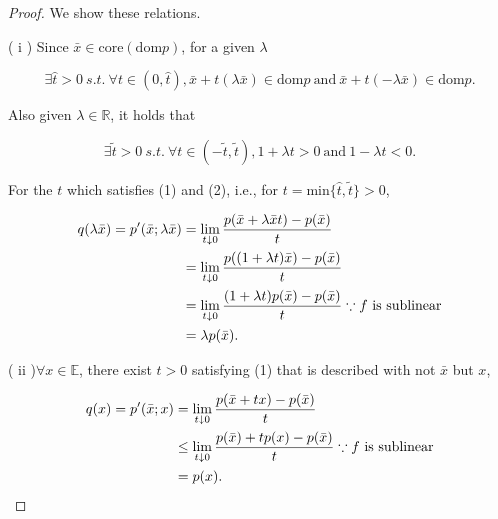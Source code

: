 \documentclass[a4paper,11pt]{jsarticle}
\begin{document}
\begin{proof} We show these relations.

  ( $\mathrm{i}$ ) Since $\bar{x} \in \text{core}(\text{dom}p)$, for a given $\lambda$

  \begin{equation}
    \exists\hat{t}>0 \:s.t.\: \forall t \in (0,\hat{t}), \bar{x}+t(\lambda \bar{x}) \in \text{dom}p \:\text{and}\: \bar{x}+t(-\lambda \bar{x}) \in \text{dom}p. \tag*{(1)}
  \end{equation}

  Also given $\lambda \in \mathbb{R}$, it holds that

  \begin{equation}
    \exists\widetilde{t}>0 \:s.t.\: \forall t \in (-\widetilde{t},\widetilde{t}), 1+\lambda t>0 \:\text{and}\: 1-\lambda t<0. \tag*{(2)}
  \end{equation}


  For the $t$ which satisfies (1) and (2), i.e., for $t = \text{min}\{\hat{t},\widetilde{t}\} >0$,

  \begin{equation}
    \begin{split}
      q(\lambda \bar{x}) = p'(\bar{x};\lambda \bar{x}) &= \lim_{t \downarrow 0} \frac{p(\bar{x}+\lambda \bar{x}t)-p(\bar{x})}{t} \\
      &= \lim_{t \downarrow 0} \frac{p((1 + \lambda t)\bar{x}) - p(\bar{x})}{t} \\
      &= \lim_{t \downarrow 0} \frac{(1 + \lambda t)p(\bar{x}) - p(\bar{x})}{t} \because \text{$f$ is sublinear}\\
      &= \lambda p(\bar{x}). \notag
    \end{split}
  \end{equation}

  ( $\mathrm{ii}$ )$\forall x \in \mathbb{E}$, there exist $t>0$ satisfying (1) that is described with not $\bar{x}$ but $x$,

  \begin{equation}
    \begin{split}
      q(x) = p'(\bar{x};x) &= \lim_{t \downarrow 0} \frac{p(\bar{x}+tx)-p(\bar{x})}{t} \\
      &\leq \lim_{t \downarrow 0} \frac{p(\bar{x}) + tp(x) - p(\bar{x})}{t} \because \text{$f$ is sublinear}\\
      &= p(x). \notag
    \end{split}
  \end{equation}


\end{proof}
\end{document}
